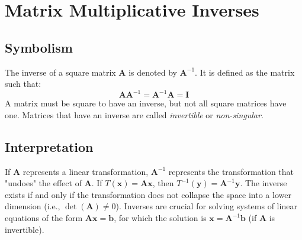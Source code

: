 \documentclass{article}
\newcommand{\vect}[1]{\bm{#1}} %
\newcommand{\mat}[1]{\bm{#1}}  %
\begin{document}
\section{Matrix Multiplicative Inverses}

\subsection*{Symbolism}
The inverse of a square matrix $\mat{A}$ is denoted by $\mat{A}^{-1}$. It is defined as the matrix such that:
\[ \mat{A}\mat{A}^{-1} = \mat{A}^{-1}\mat{A} = \mat{I} \]
A matrix must be square to have an inverse, but not all square matrices have one. Matrices that have an inverse are called \emph{invertible} or \emph{non-singular}.

\subsection*{Interpretation}
If $\mat{A}$ represents a linear transformation, $\mat{A}^{-1}$ represents the transformation that "undoes" the effect of $\mat{A}$. If $T(\vect{x}) = \mat{A}\vect{x}$, then $T^{-1}(\vect{y}) = \mat{A}^{-1}\vect{y}$. The inverse exists if and only if the transformation does not collapse the space into a lower dimension (i.e., $\det(\mat{A}) \neq 0$). Inverses are crucial for solving systems of linear equations of the form $\mat{A}\vect{x} = \vect{b}$, for which the solution is $\vect{x} = \mat{A}^{-1}\vect{b}$ (if $\mat{A}$ is invertible).
\end{document}
